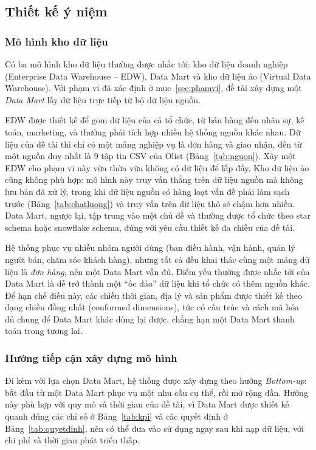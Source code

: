 \subsection{Thiết kế ý niệm}

\subsubsection{Mô hình kho dữ liệu}\label{sec:mohinhkho}

Có ba mô hình kho dữ liệu thường được nhắc tới: kho dữ liệu doanh nghiệp (Enterprise Data Warehouse -- EDW), Data Mart và kho dữ liệu ảo (Virtual Data Warehouse). Với phạm vi đã xác định ở mục~\ref{sec:phamvi}, đề tài xây dựng một \textit{Data Mart} lấy dữ liệu trực tiếp từ bộ dữ liệu nguồn.

EDW được thiết kế để gom dữ liệu của cả tổ chức, từ bán hàng đến nhân sự, kế toán, marketing, và thường phải tích hợp nhiều hệ thống nguồn khác nhau. Dữ liệu của đề tài thì chỉ có một mảng nghiệp vụ là đơn hàng và giao nhận, đến từ một nguồn duy nhất là 9 tập tin CSV của Olist (Bảng~\ref{tab:nguon}). Xây một EDW cho phạm vi này vừa thừa vừa không có dữ liệu để lấp đầy. Kho dữ liệu ảo cũng không phù hợp: mô hình này truy vấn thẳng trên dữ liệu nguồn mà không lưu bản đã xử lý, trong khi dữ liệu nguồn có hàng loạt vấn đề phải làm sạch trước (Bảng~\ref{tab:chatluong}) và truy vấn trên dữ liệu thô sẽ chậm hơn nhiều. Data Mart, ngược lại, tập trung vào một chủ đề và thường được tổ chức theo star schema hoặc snowflake schema, đúng với yêu cầu thiết kế đa chiều của đề tài.

Hệ thống phục vụ nhiều nhóm người dùng (ban điều hành, vận hành, quản lý người bán, chăm sóc khách hàng), nhưng tất cả đều khai thác cùng một mảng dữ liệu là \textit{đơn hàng}, nên một Data Mart vẫn đủ. Điểm yếu thường được nhắc tới của Data Mart là dễ trở thành một ``ốc đảo'' dữ liệu khi tổ chức có thêm nguồn khác. Để hạn chế điều này, các chiều thời gian, địa lý và sản phẩm được thiết kế theo dạng chiều đồng nhất (conformed dimensions), tức có cấu trúc và cách mã hóa đủ chung để Data Mart khác dùng lại được, chẳng hạn một Data Mart thanh toán trong tương lai.

\subsubsection{Hướng tiếp cận xây dựng mô hình}

Đi kèm với lựa chọn Data Mart, hệ thống được xây dựng theo hướng \textit{Bottom-up}: bắt đầu từ một Data Mart phục vụ một nhu cầu cụ thể, rồi mở rộng dần. Hướng này phù hợp với quy mô và thời gian của đề tài, vì Data Mart được thiết kế quanh đúng các chỉ số ở Bảng~\ref{tab:kpi} và các quyết định ở Bảng~\ref{tab:quyetdinh}, nên có thể đưa vào sử dụng ngay sau khi nạp dữ liệu, với chi phí và thời gian phát triển thấp.

